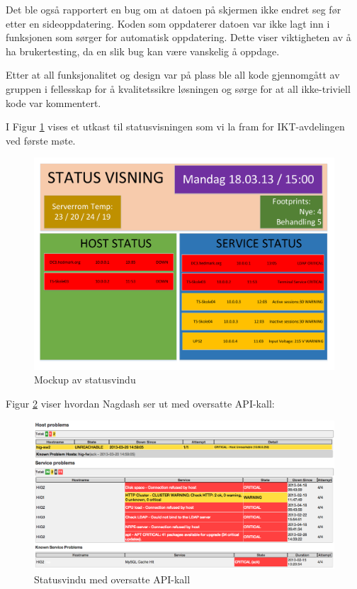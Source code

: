 Det ble også rapportert en bug om at datoen på skjermen ikke endret seg før etter en sideoppdatering. Koden som oppdaterer datoen var ikke lagt inn i funksjonen som sørger for automatisk oppdatering. Dette viser viktigheten av å ha brukertesting, da en slik bug kan være vanskelig å oppdage.

Etter at all funksjonalitet og design var på plass ble all kode gjennomgått av gruppen i fellesskap for å kvalitetssikre løsningen og sørge for at all ikke-triviell kode var kommentert.

I Figur \ref{statusvindu_utkast} vises et utkast til statusvisningen som vi la fram for IKT-avdelingen ved første møte.

\begin{figure}[H]
    \centering
    \includegraphics[scale=0.3]{img/statusvindu_mockup}
    \caption{Mockup av statusvindu}
    \label{statusvindu_utkast}
\end{figure}

Figur \ref{statusvindu_oversatte_kall} viser hvordan Nagdash ser ut med oversatte API-kall:

\begin{figure}[H]
    \centering
    \includegraphics[scale=0.3]{img/statusvindu_oversatte_kall}
    \caption{Statusvindu med oversatte API-kall}
    \label{statusvindu_oversatte_kall}
\end{figure}

